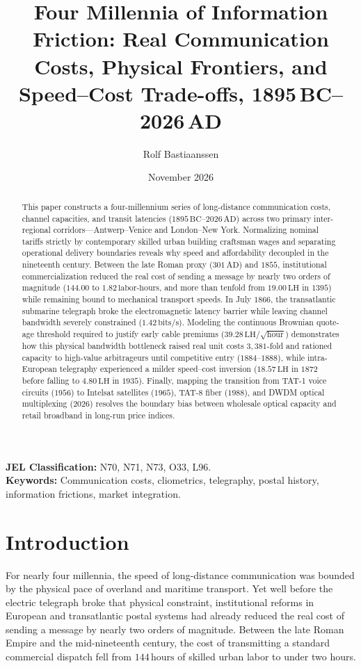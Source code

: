 \documentclass[11pt,a4paper]{article}
\title{\textbf{Four Millennia of Information Friction: Real Communication Costs, Physical Frontiers, and Speed--Cost Trade-offs, 1895\,BC--2026\,AD}}
\author{Rolf Bastiaanssen}
\date{November 2026}
\begin{document}
\maketitle

\begin{abstract}
This paper constructs a four-millennium series of long-distance communication costs, channel capacities, and transit latencies ($1895\,\text{BC}$--$2026\,\text{AD}$) across two primary inter-regional corridors---Antwerp--Venice and London--New York. Normalizing nominal tariffs strictly by contemporary skilled urban building craftsman wages and separating operational delivery boundaries reveals why speed and affordability decoupled in the nineteenth century. Between the late Roman proxy ($301\,\text{AD}$) and $1855$, institutional commercialization reduced the real cost of sending a message by nearly two orders of magnitude ($144.00$ to $1.82\,\text{labor-hours}$, and more than tenfold from $19.00\,\text{LH}$ in $1395$) while remaining bound to mechanical transport speeds. In July $1866$, the transatlantic submarine telegraph broke the electromagnetic latency barrier while leaving channel bandwidth severely constrained ($1.42\,\text{bits/s}$). Modeling the continuous Brownian quote-age threshold required to justify early cable premiums ($39.28\,\text{LH}/\sqrt{\text{hour}}$) demonstrates how this physical bandwidth bottleneck raised real unit costs $3,381$-fold and rationed capacity to high-value arbitrageurs until competitive entry ($1884$--$1888$), while intra-European telegraphy experienced a milder speed--cost inversion ($18.57\,\text{LH}$ in $1872$ before falling to $4.80\,\text{LH}$ in $1935$). Finally, mapping the transition from TAT-1 voice circuits ($1956$) to Intelsat satellites ($1965$), TAT-8 fiber ($1988$), and DWDM optical multiplexing ($2026$) resolves the boundary bias between wholesale optical capacity and retail broadband in long-run price indices.
\end{abstract}

\noindent\textbf{JEL Classification:} N70, N71, N73, O33, L96.\\
\textbf{Keywords:} Communication costs, cliometrics, telegraphy, postal history, information frictions, market integration.

\section{Introduction}
\label{sec:introduction}

For nearly four millennia, the speed of long-distance communication was bounded by the physical pace of overland and maritime transport. Yet well before the electric telegraph broke that physical constraint, institutional reforms in European and transatlantic postal systems had already reduced the real cost of sending a message by nearly two orders of magnitude. Between the late Roman Empire and the mid-nineteenth century, the cost of transmitting a standard commercial dispatch fell from $144\,\text{hours}$ of skilled urban labor to under two hours.
\end{document}
